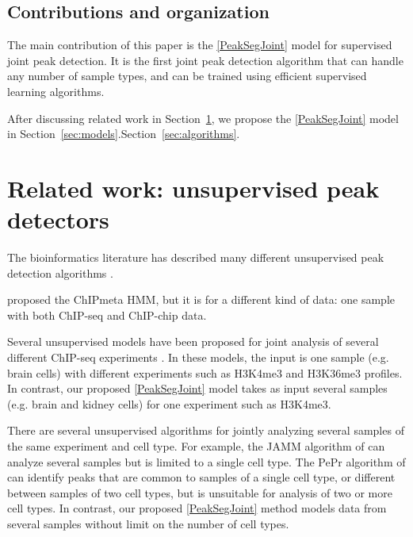 \documentclass{article} %
\begin{document}
\subsection{Contributions and organization}

The main contribution of this paper is the \ref{PeakSegJoint} model
for supervised joint peak detection. It is the first joint peak
detection algorithm that can handle any number of sample types, and
can be trained using efficient supervised learning algorithms.

After discussing related work in Section~\ref{sec:related}, we
propose the \ref{PeakSegJoint} model in Section~\ref{sec:models}.Section~\ref{sec:algorithms}.


\section{Related work: unsupervised peak detectors}
\label{sec:related}

The bioinformatics literature has described many different
unsupervised peak detection algorithms \citep{evaluation2010,
  rye2010manually, chip-seq-bench}.

\citet{hierarchical-joint} proposed the ChIPmeta HMM, but it is for a
different kind of data: one sample with both ChIP-seq and ChIP-chip
data.

Several unsupervised models have been proposed for joint analysis of
several different ChIP-seq experiments
\citep{jmosaics,segway,chromhmm}. In these models, the input is one
sample (e.g. brain cells) with different experiments such as H3K4me3
and H3K36me3 profiles. In contrast, our proposed \ref{PeakSegJoint} model
takes as input several samples (e.g. brain and kidney cells) for one
experiment such as H3K4me3.

There are several unsupervised algorithms for jointly analyzing
several samples of the same experiment and cell type. For example, the
JAMM algorithm of \citet{JAMM} can analyze several samples but is
limited to a single cell type. 
The PePr algorithm of \citet{PePr} can identify peaks that are common
to samples of a single cell type, or different between samples of two
cell types, but is unsuitable for analysis of two or more cell
types. In contrast, our proposed \ref{PeakSegJoint} method models data
from several samples without limit on the number of cell types.
\end{document}
